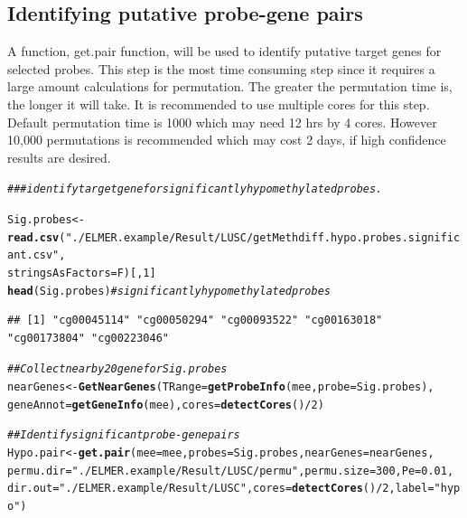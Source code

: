 \documentclass{article}\usepackage[]{graphicx}\usepackage[usenames,dvipsnames]{color}
\makeatletter
\newcommand{\hlnum}[1]{\textcolor[rgb]{0.686,0.059,0.569}{#1}}%
\newcommand{\hlstr}[1]{\textcolor[rgb]{0.192,0.494,0.8}{#1}}%
\newcommand{\hlcom}[1]{\textcolor[rgb]{0.678,0.584,0.686}{\textit{#1}}}%
\newcommand{\hlopt}[1]{\textcolor[rgb]{0,0,0}{#1}}%
\newcommand{\hlstd}[1]{\textcolor[rgb]{0.345,0.345,0.345}{#1}}%
\newcommand{\hlkwb}[1]{\textcolor[rgb]{0.69,0.353,0.396}{#1}}%
\newcommand{\hlkwc}[1]{\textcolor[rgb]{0.333,0.667,0.333}{#1}}%
\newcommand{\hlkwd}[1]{\textcolor[rgb]{0.737,0.353,0.396}{\textbf{#1}}}%
\newenvironment{kframe}{%
 \def\at@end@of@kframe{}%
 \ifinner\ifhmode%
  \def\at@end@of@kframe{\end{minipage}}%
  \begin{minipage}{\columnwidth}%
 \fi\fi%
 \def\FrameCommand##1{\hskip\@totalleftmargin \hskip-\fboxsep
 \colorbox{shadecolor}{##1}\hskip-\fboxsep
     \hskip-\linewidth \hskip-\@totalleftmargin \hskip\columnwidth}%
 \MakeFramed {\advance\hsize-\width
   \@totalleftmargin\z@ \linewidth\hsize
   \@setminipage}}%
 {\par\unskip\endMakeFramed%
 \at@end@of@kframe}
\newenvironment{knitrout}{}{} %
\makeatother
\begin{document}
\subsection{Identifying putative probe-gene pairs}
A function, get.pair function, will be used to identify putative target genes for selected probes. 
This step is the most time consuming step since it requires a large amount calculations 
for permutation. The greater the permutation time is, the longer it will take. 
It is recommended to use multiple cores for this step. Default permutation time 
is 1000 which may need 12 hrs by 4 cores. However 10,000 permutations is recommended 
which may cost 2 days, if high confidence results are desired.
\begin{knitrout}
\color{fgcolor}\begin{kframe}
\begin{alltt}
\hlcom{### identify target gene for significantly hypomethylated probes.}

\hlstd{Sig.probes} \hlkwb{<-} \hlkwd{read.csv}\hlstd{(}\hlstr{"./ELMER.example/Result/LUSC/getMethdiff.hypo.probes.significant.csv"}\hlstd{,}
                       \hlkwc{stringsAsFactors}\hlstd{=F)[,}\hlnum{1}\hlstd{]}
\hlkwd{head}\hlstd{(Sig.probes)}  \hlcom{# significantly hypomethylated probes}
\end{alltt}
\begin{verbatim}
## [1] "cg00045114" "cg00050294" "cg00093522" "cg00163018" "cg00173804" "cg00223046"
\end{verbatim}
\begin{alltt}
\hlcom{## Collect nearby 20 gene for Sig.probes}
\hlstd{nearGenes} \hlkwb{<-}\hlkwd{GetNearGenes}\hlstd{(}\hlkwc{TRange}\hlstd{=}\hlkwd{getProbeInfo}\hlstd{(mee,}\hlkwc{probe}\hlstd{=Sig.probes),}
                         \hlkwc{geneAnnot}\hlstd{=}\hlkwd{getGeneInfo}\hlstd{(mee),}\hlkwc{cores}\hlstd{=}\hlkwd{detectCores}\hlstd{()}\hlopt{/}\hlnum{2}\hlstd{)}

\hlcom{## Identify significant probe-gene pairs}
\hlstd{Hypo.pair} \hlkwb{<-}\hlkwd{get.pair}\hlstd{(}\hlkwc{mee}\hlstd{=mee,}\hlkwc{probes}\hlstd{=Sig.probes,}\hlkwc{nearGenes}\hlstd{=nearGenes,}
                     \hlkwc{permu.dir}\hlstd{=}\hlstr{"./ELMER.example/Result/LUSC/permu"}\hlstd{,}\hlkwc{permu.size}\hlstd{=}\hlnum{300}\hlstd{,}\hlkwc{Pe} \hlstd{=} \hlnum{0.01}\hlstd{,}
                     \hlkwc{dir.out}\hlstd{=}\hlstr{"./ELMER.example/Result/LUSC"}\hlstd{,}\hlkwc{cores}\hlstd{=}\hlkwd{detectCores}\hlstd{()}\hlopt{/}\hlnum{2}\hlstd{,}\hlkwc{label}\hlstd{=} \hlstr{"hypo"}\hlstd{)}
\end{alltt}



\end{kframe}
\end{knitrout}
\end{document}
